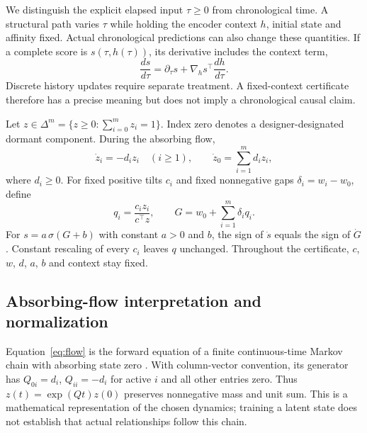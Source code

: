 We distinguish the explicit elapsed input $\tau\ge0$ from chronological time. A structural path varies $\tau$ while holding the encoder context $h$, initial state and affinity fixed. Actual chronological predictions can also change these quantities. If a complete score is $s(\tau,h(\tau))$, its derivative includes the context term,
\begin{equation}\label{eq:chain}
\frac{d s}{d\tau}=\partial_\tau s+\nabla_hs^\top\frac{dh}{d\tau}.
\end{equation}
Discrete history updates require separate treatment. A fixed-context certificate therefore has a precise meaning but does not imply a chronological causal claim.

Let $z\in\Delta^m=\{z\ge0:\sum_{i=0}^m z_i=1\}$. Index zero denotes a designer-designated dormant component. During the absorbing flow,
\begin{equation}\label{eq:flow}
\dot z_i=-d_i z_i\quad(i\ge1),\qquad
\dot z_0=\sum_{i=1}^m d_i z_i,
\end{equation}
where $d_i\ge0$. For fixed positive tilts $c_i$ and fixed nonnegative gaps $\delta_i=w_i-w_0$, define
\begin{equation}\label{eq:tilt}
q_i=\frac{c_i z_i}{c^\top z},\qquad
G=w_0+\sum_{i=1}^m\delta_i q_i.
\end{equation}
For $s=a\,\sigma(G+b)$ with constant $a>0$ and $b$, the sign of $\dot s$ equals the sign of $\dot G$. Constant rescaling of every $c_i$ leaves $q$ unchanged. Throughout the certificate, $c$, $w$, $d$, $a$, $b$ and context stay fixed.

\subsection{Absorbing-flow interpretation and normalization}
Equation~\eqref{eq:flow} is the forward equation of a finite continuous-time Markov chain with absorbing state zero \cite{norris}. With column-vector convention, its generator has $Q_{0i}=d_i$, $Q_{ii}=-d_i$ for active $i$ and all other entries zero. Thus $z(t)=\exp(Qt)z(0)$ preserves nonnegative mass and unit sum. This is a mathematical representation of the chosen dynamics; training a latent state does not establish that actual relationships follow this chain.

